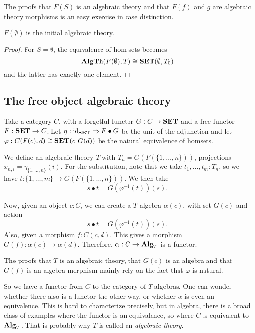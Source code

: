 The proofs that $ F(S) $ is an algebraic theory and that $ F(f) $ and $ g $ are algebraic theory morphisms is an easy exercise in case distinction.

\begin{corollary}
  $ F(\emptyset) $ is the initial algebraic theory.
\end{corollary}
\begin{proof}
  For $ S = \emptyset $, the equivalence of hom-sets becomes
  \[ \mathbf{AlgTh}(F(\emptyset), T) \cong \mathbf{SET}(\emptyset, T_0) \]
  and the latter has exactly one element.
\end{proof}

\subsection{The free object algebraic theory}

\begin{example}
  Take a category $ C $, with a forgetful functor $ G: C \to \mathbf{SET} $ and a free functor $ F: \mathbf{SET} \to C $. Let $ \eta: \text{id}_{\mathbf{SET}} \Rightarrow F \bullet G $ be the unit of the adjunction and let $ \varphi: C(F(c), d) \cong \mathbf{SET}(c, G(d)) $ be the natural equivalence of homsets.

  We define an algebraic theory $ T $ with $ T_n = G(F(\{ 1, \dots, n \})) $, projections $ x_{n, i} = \eta_{\{1, \dots, n\}}(i) $. For the substitution, note that we take $ t_1, \dots, t_m: T_n $, so we have $ t: \{ 1, \dots, m \} \to G(F(\{ 1, \dots, n \})) $. We then take
  \[ s \bullet t = G(\varphi^{-1}(t))(s). \]

  Now, given an object $ c: C $, we can create a $ T $-algebra $ \alpha(c) $, with set $ G(c) $ and action
  \[ s \bullet t = G(\varphi^{-1}(t))(s). \]
  Also, given a morphism $ f: C(c, d) $. This gives a morphism $ G(f): \alpha(c) \to \alpha(d) $. Therefore, $ \alpha: C \to \mathbf{Alg}_{T} $ is a functor.
\end{example}

The proofs that $ T $ is an algebraic theory, that $ G(c) $ is an algebra and that $ G(f) $ is an algebra morphism mainly rely on the fact that $ \varphi $ is natural.

So we have a functor from $ C $ to the category of $ T $-algebras. One can wonder whether there also is a functor the other way, or whether $ \alpha $ is even an equivalence. This is hard to characterize precisely, but in algebra, there is a broad class of examples where the functor is an equivalence, so where $ C $ is equivalent to $ \mathbf{Alg}_{T} $. That is probably why $ T $ is called an \textit{algebraic theory}.

